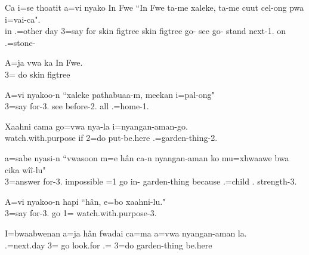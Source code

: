 \ea
\gll Ca i=se thoatit a=vi nyako In Fwe ``In Fwe ta-me xaleke, ta-me cuut cel-ong pwa i=vai-ca".\\ in .=other day 3=say for skin figtree skin figtree go- see go- stand next-1. on .=stone-\\ \glt {}
\z

\ea
\gll A=ja vwa ka In Fwe.\\ 3= do  skin figtree\\ \glt {}
\z

\ea
\gll A=vi nyakoo-n ``xaleke pathabuaa-m, meekan i=pal-ong"\\ 3=say for-3. see before-2. all .=home-1.\\ \glt  {} 
\z

\ea
\gll Xaahni cama go=vwa nya-la i=nyangan-aman-go.\\ watch.with.purpose if 2=do put-be.here .=garden-thing-2.\\ \glt  {}
\z

\ea
\gll a=sabe nyasi-n ``vwasoon m=e hân ca-n nyangan-aman ko mu=xhwaawe bwa cika wîî-lu"\\ 3=answer for-3. impossible =1 go in- garden-thing because .=child  . strength-3.\\ \glt {}
\z

\ea
\gll A=vi nyakoo-n hapi ``hân, e=bo xaahni-lu."\\ 3=say for-3.  go 1= watch.with.purpose-3.\\ \glt  {}
\z

\ea
\gll I=bwaabwenan a=ja hân fwadai ca=ma a=vwa nyangan-aman la.\\ .=next.day 3= go look.for .= 3=do garden-thing be.here\\ \glt {}
\z

